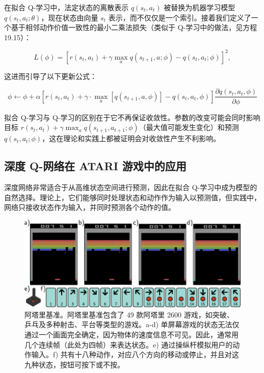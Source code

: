 \documentclass[lang=cn,newtx,10pt,scheme=chinese]{elegantbook}
\begin{document}
在拟合 Q-学习中，法定状态的离散表示 \(q(s_t, a_t)\) 被替换为机器学习模型 \(q(s_t, a_t; \theta)\)，现在状态由向量 \(s_t\) 表示，而不仅仅是一个索引。接着我们定义了一个基于相邻动作价值一致性的最小二乘法损失（类似于 Q-学习中的做法，见方程 19.15）：

\begin{equation}
L(\phi) = \left[ r(s_t, a_t) + \gamma \max_{a} q(s_{t+1}, a; \phi) - q(s_t, a_t; \phi) \right]^2, 
\end{equation}

这进而引导了以下更新公式：

\begin{equation}
\phi \leftarrow \phi + \alpha \left[ r(s_t, a_t) + \gamma \cdot \max_a [q(s_{t+1}, a, \phi)] - q(s_t, a_t, \phi) \right] \frac{\partial q(s_t, a_t, \phi)}{\partial \phi} 
\end{equation}

拟合 Q-学习与 Q-学习的区别在于它不再保证收敛性。参数的改变可能会同时影响目标 \(r(s_t, a_t) + \gamma \max_{a} q(s_{t+1}, a_{t+1}; \phi)\)（最大值可能发生变化）和预测 \(q(s_t, a_t; \phi)\)，这在理论和实践上都被证明会对收敛性产生不利影响。

\subsection{深度 Q-网络在 ATARI 游戏中的应用}
深度网络非常适合于从高维状态空间进行预测，因此在拟合 Q-学习中成为模型的自然选择。理论上，它们能够同时处理状态和动作作为输入以预测值，但实践中，网络只接收状态作为输入，并同时预测各个动作的值。

\begin{figure}[ht!]
\centering
\includegraphics[width=0.7\linewidth]{PDFFigures/UDLChap19PDF/ReinforceDQL.pdf}
\caption{阿塔里基准。阿塔里基准包含了 49 款阿塔里 2600 游戏，如突破、乒乓及多种射击、平台等类型的游戏。a-d) 单屏幕游戏的状态无法仅通过一个画面完全确定，因为物体的速度信息不可见。因此，通常用几个连续帧（此处为四帧）来表达状态。e) 通过操纵杆模拟用户的动作输入。f) 共有十八种动作，对应八个方向的移动或停止，并且对这九种状态，按钮可按下或不按。}
\end{figure}
\end{document}
